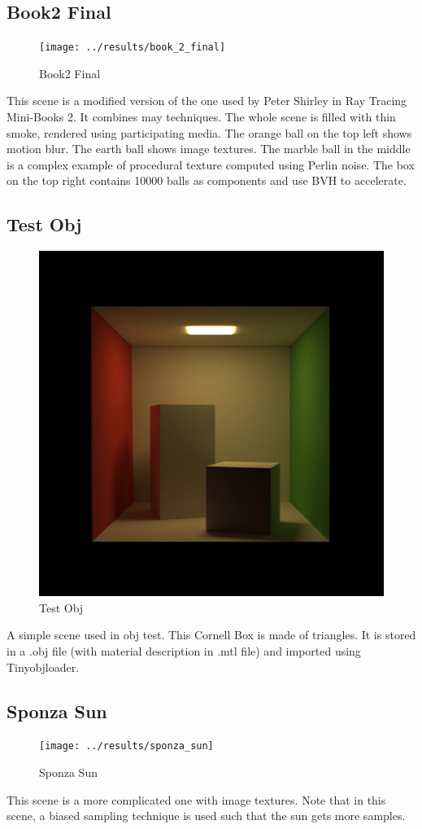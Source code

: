 \documentclass[utf8]{article}
\begin{document}
\subsection{Book2 Final}
\begin{figure}[H]
	\centering
	\texttt{[image: ../results/book\_2\_final]}
	\caption{Book2 Final}
	\label{fig:book2final}
\end{figure}
This scene is a modified version of the one used by Peter Shirley in Ray Tracing Mini-Books 2. It combines may techniques. The whole scene is filled with thin smoke, rendered using participating media. The orange ball on the top left shows motion blur. The earth ball shows image textures. The marble ball in the middle is a complex example of procedural texture computed using Perlin noise. The box on the top right contains 10000 balls as components and use BVH to accelerate.

\subsection{Test Obj}
\begin{figure}[H]
	\centering
	\includegraphics[width=0.45\linewidth]{../results/test_obj}
	\caption{Test Obj}
	\label{fig:testobj}
\end{figure}
A simple scene used in obj test. This Cornell Box is made of triangles. It is stored in a .obj file (with material description in .mtl file) and imported using Tinyobjloader.

\subsection{Sponza Sun}
\begin{figure}[H]
	\centering
	\texttt{[image: ../results/sponza\_sun]}
	\caption{Sponza Sun}
	\label{fig:sponzasun}
\end{figure}
This scene is a more complicated one with image textures. Note that in this scene, a biased sampling technique is used such that the sun gets more samples.
\end{document}
